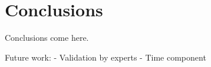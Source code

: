 \section{Conclusions}\label{sec:conclusions}

Conclusions come here.

Future work:
- Validation by experts
- Time component
